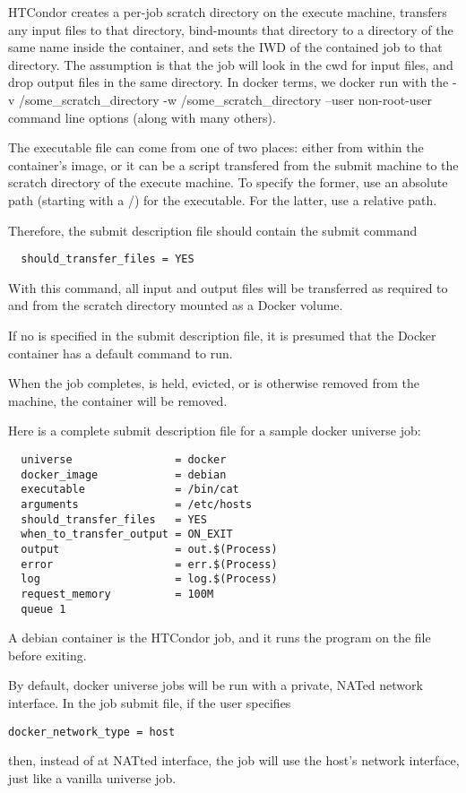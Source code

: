 HTCondor creates a per-job scratch directory on the execute machine, transfers 
any input files to that directory, bind-mounts that directory to a directory 
of the same name inside the container, and sets the IWD of the contained job 
to that directory.  The assumption is that the job will look in the cwd for 
input files, and drop output files in the same directory.  In docker 
terms, we docker run with the -v /some\_scratch\_directory 
-w /some\_scratch\_directory --user non-root-user command line options 
(along with many others). 

The executable file can come from one of two places:  either from within
the container's image, or it can be a script transfered from the submit
machine to the scratch directory of the execute machine.  To specify the
former, use an absolute path (starting with a /) for the executable.  For
the latter, use a relative path.

Therefore,
the submit description file should contain the submit command
\begin{verbatim}
  should_transfer_files = YES
\end{verbatim}
With this command,  all input and output files will be transferred
as required to and from the scratch directory mounted as a
Docker volume.

If no  is specified in the submit description file,
it is presumed that the Docker container has a default command to run.

When the job completes, is held, evicted, 
or is otherwise removed from the machine, the container will be removed.

Here is a complete submit description file for a sample docker universe job:
\begin{verbatim}
  universe                = docker
  docker_image            = debian
  executable              = /bin/cat
  arguments               = /etc/hosts
  should_transfer_files   = YES
  when_to_transfer_output = ON_EXIT
  output                  = out.$(Process)
  error                   = err.$(Process)
  log                     = log.$(Process)
  request_memory          = 100M
  queue 1
\end{verbatim}

A debian container is the HTCondor job,
and it runs the  program on the  file
before exiting.

By default, docker universe jobs will be run with a private, NATed network
interface.  In the job submit file, if the user specifies
\begin{verbatim}
docker_network_type = host
\end{verbatim}

then, instead of at NATted interface, the job will use the host's network 
interface, just like a vanilla universe job.
